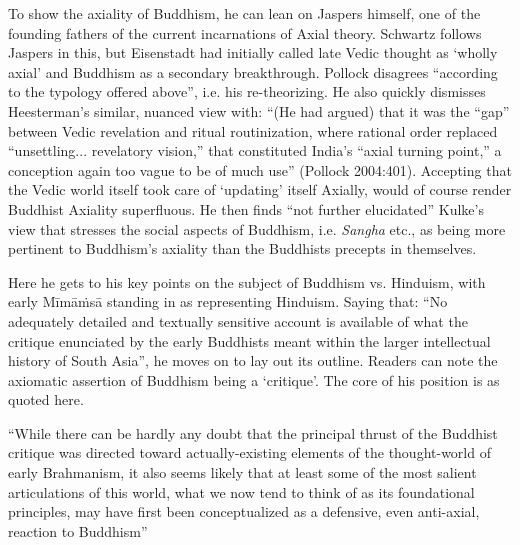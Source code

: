 To show the axiality of Buddhism, he can lean on Jaspers himself, one of the founding fathers of the current incarnations of Axial theory. Schwartz follows Jaspers in this, but Eisenstadt had initially called late Vedic thought as ‘wholly axial’ and Buddhism as a secondary breakthrough. Pollock disagrees “according to the typology offered above”, i.e. his re-theorizing. He also quickly dismisses Heesterman’s similar, nuanced view with: “(He had argued) that it was the “gap” between Vedic revelation and ritual routinization, where rational order replaced “unsettling... revelatory vision,” that constituted India’s “axial turning point,” a conception again too vague to be of much use” (Pollock 2004:401). Accepting that the Vedic world itself took care of ‘updating’ itself Axially, would of course render Buddhist Axiality superfluous. He then finds “not further elucidated” Kulke’s view that stresses the social aspects of Buddhism, i.e. \textit{Sangha} etc., as being more pertinent to Buddhism’s axiality than the Buddhists precepts in themselves.

\vspace{.1cm}

Here he gets to his key points on the subject of Buddhism vs. Hinduism, with early Mīmāṁsā standing in as representing Hinduism. Saying that: “No adequately detailed and textually sensitive account is available of what the critique enunciated by the early Buddhists meant within the larger intellectual history of South Asia”, he moves on to lay out its outline. Readers can note the axiomatic assertion of Buddhism being a ‘critique’. The core of his position is as quoted here.

\vspace{.1cm}

\begin{myquote}
“While there can be hardly any doubt that the principal thrust of the Buddhist critique was directed toward actually-existing elements of the thought-world of early Brahmanism, it also seems likely that at least some of the most salient articulations of this world, what we now tend to think of as its foundational principles, may have first been conceptualized as a defensive, even anti-axial, reaction to Buddhism”
\end{myquote}

\vspace{.1cm}

